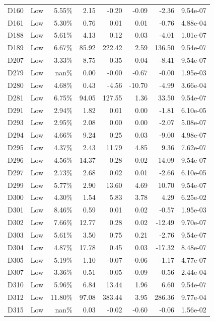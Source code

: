 \begin{tabular}{l l r r r r r r}
D160 & Low & 5.55\% & 2.15 & -0.20 & -0.09 & -2.36 & 9.54e-07 \\
D161 & Low & 5.30\% & 0.76 & 0.01 & 0.01 & -0.76 & 4.88e-04 \\
D188 & Low & 5.61\% & 4.13 & 0.12 & 0.03 & -4.01 & 1.01e-07 \\
D189 & Low & 6.67\% & 85.92 & 222.42 & 2.59 & 136.50 & 9.54e-07 \\
D207 & Low & 3.33\% & 8.75 & 0.35 & 0.04 & -8.41 & 9.54e-07 \\
D279 & Low & nan\% & 0.00 & -0.00 & -0.67 & -0.00 & 1.95e-03 \\
D280 & Low & 4.68\% & 0.43 & -4.56 & -10.70 & -4.99 & 3.66e-04 \\
D281 & Low & 6.75\% & 94.05 & 127.55 & 1.36 & 33.50 & 9.54e-07 \\
D291 & Low & 2.94\% & 1.82 & 0.01 & 0.00 & -1.81 & 6.10e-05 \\
D293 & Low & 2.95\% & 2.08 & 0.00 & 0.00 & -2.07 & 5.08e-07 \\
D294 & Low & 4.66\% & 9.24 & 0.25 & 0.03 & -9.00 & 4.98e-07 \\
D295 & Low & 4.37\% & 2.43 & 11.79 & 4.85 & 9.36 & 7.62e-07 \\
D296 & Low & 4.56\% & 14.37 & 0.28 & 0.02 & -14.09 & 9.54e-07 \\
D297 & Low & 2.73\% & 2.68 & 0.02 & 0.01 & -2.66 & 6.10e-05 \\
D299 & Low & 5.77\% & 2.90 & 13.60 & 4.69 & 10.70 & 9.54e-07 \\
D300 & Low & 4.30\% & 1.54 & 5.83 & 3.78 & 4.29 & 6.25e-02 \\
D301 & Low & 8.46\% & 0.59 & 0.01 & 0.02 & -0.57 & 1.95e-03 \\
D302 & Low & 7.66\% & 12.77 & 0.28 & 0.02 & -12.49 & 9.70e-07 \\
D303 & Low & 5.61\% & 3.50 & 0.75 & 0.21 & -2.76 & 9.54e-07 \\
D304 & Low & 4.87\% & 17.78 & 0.45 & 0.03 & -17.32 & 8.48e-07 \\
D305 & Low & 5.19\% & 1.10 & -0.07 & -0.06 & -1.17 & 4.77e-07 \\
D307 & Low & 3.36\% & 0.51 & -0.05 & -0.09 & -0.56 & 2.44e-04 \\
D310 & Low & 5.96\% & 6.84 & 13.44 & 1.96 & 6.60 & 9.54e-07 \\
D312 & Low & 11.80\% & 97.08 & 383.44 & 3.95 & 286.36 & 9.77e-04 \\
D315 & Low & nan\% & 0.03 & -0.02 & -0.60 & -0.06 & 1.56e-02 \\

\end{tabular}
